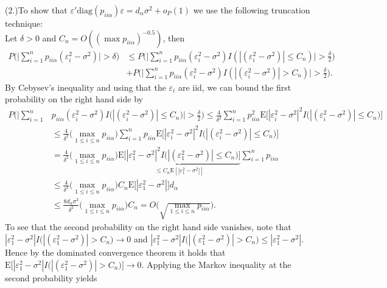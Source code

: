 \documentclass[Research_Module_ES.tex]{subfiles}
\begin{document}
(2.)To show that $\varepsilon'\mathrm{diag}(p_{ii\alpha})\varepsilon=d_\alpha \sigma^2+o_P(1)$ we use the following truncation technique:\\
Let $\delta>0$ and $C_n=O((\max p_{ii\alpha})^{-0.5})$, then 
\begin{align*}
P\biggl(\biggl|\sum_{i=1}^n p_{ii\alpha} (\varepsilon_i^2-\sigma^2)\biggr|>\delta\biggr)&\le
 P\biggl(\biggl|\sum_{i=1}^n p_{ii\alpha}(\varepsilon_i^2-\sigma^2)I(|(\varepsilon_i^2-\sigma^2)|\le C_n)\biggr|>\frac{\delta}{2}\biggr)\\
&+  P\biggl(\biggl|\sum_{i=1}^n p_{ii\alpha}(\varepsilon_i^2-\sigma^2)I(|(\varepsilon_i^2-\sigma^2)|> C_n)\biggr|>\frac{\delta}{2}\biggr).
\end{align*}
By Cebysev's inequality and using that the $\varepsilon_i$ are iid, we can bound the first probability on the right hand side by
\begin{align*}
P\biggl(\biggl|\sum_{i=1}^n &p_{ii\alpha}(\varepsilon_i^2-\sigma^2)I\bigl(|(\varepsilon_i^2-\sigma^2)|\le C_n\bigr)\biggr|>\frac{\delta}{2}\biggr)\le \frac{4}{\delta^2}\sum_{i=1}^n p_{ii\alpha}^2\mathrm{E}\bigl[|\varepsilon_i^2-\sigma^2|^2I\bigl(|(\varepsilon_i^2-\sigma^2)|\le C_n\bigr)\bigr]\\
&\le \frac{4}{\delta^2}\bigl(\max_{1\le i\le n}p_{ii\alpha}\bigr)\sum_{i=1}^n p_{ii\alpha}\mathrm{E}\bigl[|\varepsilon_i^2-\sigma^2|^2I\bigl(|(\varepsilon_i^2-\sigma^2)|\le C_n\bigr)\bigr]\\
&= \frac{4}{\delta^2}\bigl(\max_{1\le i\le n}p_{ii\alpha}\bigr)\underbrace{\mathrm{E}\bigl[|\varepsilon_1^2-\sigma^2|^2I\bigl(|(\varepsilon_1^2-\sigma^2)|\le C_n\bigr)\bigr]}_{\le C_n\mathrm{E}[|\varepsilon_1^2-\sigma^2|]}\sum_{i=1}^n p_{ii\alpha}\\
&\le \frac{4}{\delta^2}\bigl(\max_{1\le i\le n}p_{ii\alpha}\bigr)C_n\mathrm{E}\bigl[|\varepsilon_1^2-\sigma^2|\bigr]d_\alpha\\
&\le \frac{8d_\alpha\sigma^2}{\delta^2}\bigl(\max_{1\le i\le n}p_{ii\alpha}\bigr)C_n = O\bigl(\sqrt{\max_{1\le i\le n}p_{ii\alpha}}\bigr).
\end{align*}
To see that the second probability on the right hand side vanishes, note that $|\varepsilon_1^2-\sigma^2|I\bigl(|(\varepsilon_1^2-\sigma^2)|> C_n\bigr)\to 0$ and $|\varepsilon_1^2-\sigma^2|I\bigl(|(\varepsilon_1^2-\sigma^2)|> C_n\bigr)\le |\varepsilon_1^2-\sigma^2|$. Hence by the dominated convergence theorem it holds that $\mathrm{E}\bigl[|\varepsilon_1^2-\sigma^2|I\bigl(|(\varepsilon_1^2-\sigma^2)|> C_n\bigr)\bigr] \to 0$. Applying the Markov inequality at the second probability yields
\end{document}
